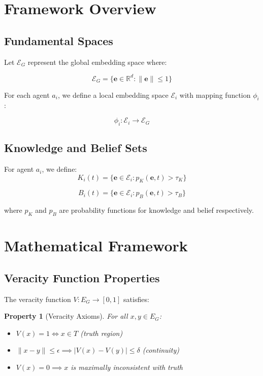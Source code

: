 \documentclass{article}
\newtheorem{property}{Property}
\begin{document}
\section{Framework Overview}
\subsection{Fundamental Spaces}
Let $\mathcal{E}_G$ represent the global embedding space where:

\begin{equation}
\mathcal{E}_G = \{\mathbf{e} \in \mathbb{R}^d : \|\mathbf{e}\| \leq 1\}
\end{equation}

For each agent $a_i$, we define a local embedding space $\mathcal{E}_i$ with mapping function $\phi_i$:

\begin{equation}
\phi_i: \mathcal{E}_i \rightarrow \mathcal{E}_G
\end{equation}

\subsection{Knowledge and Belief Sets}
For agent $a_i$, we define:
\begin{equation}
K_i(t) = \{\mathbf{e} \in \mathcal{E}_i : p_K(\mathbf{e}, t) > \tau_K\}
\end{equation}

\begin{equation}
B_i(t) = \{\mathbf{e} \in \mathcal{E}_i : p_B(\mathbf{e}, t) > \tau_B\}
\end{equation}

where $p_K$ and $p_B$ are probability functions for knowledge and belief respectively.

\section{Mathematical Framework}

\subsection{Veracity Function Properties}
The veracity function $V: E_G \rightarrow [0,1]$ satisfies:

\begin{property}[Veracity Axioms]
For all $x,y \in E_G$:
\begin{itemize}
    \item $V(x) = 1 \iff x \in T$ (truth region)
    \item $\|x-y\| \leq \epsilon \implies |V(x) - V(y)| \leq \delta$ (continuity)
    \item $V(x) = 0 \implies x$ is maximally inconsistent with truth
\end{itemize}
\end{property}
\end{document}
